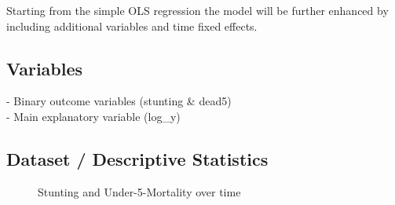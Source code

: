 \documentclass[a4paper, 11pt]{article} %
\begin{document}
Starting from the simple OLS regression the model will be further enhanced by including additional variables and time fixed effects. 

\subsection*{Variables}
- Binary outcome variables (stunting \& dead5)\\
- Main explanatory variable (log\_y)

\subsection*{Dataset / Descriptive Statistics}

\begin{figure}[h!]
    \centering
    \qquad
    \caption{Stunting and Under-5-Mortality over time}%
    \label{fig:stunting_dead5_proportion}%
\end{figure}
\end{document}
